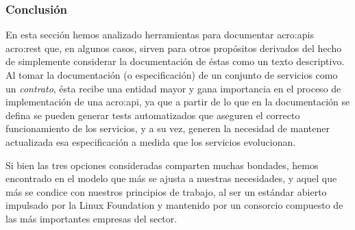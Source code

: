 \subsubsection{Conclusión}

En esta sección hemos analizado herramientas para documentar \glspl{acro:api} \gls{acro:rest} que, en algunos casos, sirven para otros propósitos derivados del hecho de simplemente considerar la documentación de éstas como un texto descriptivo. Al tomar la documentación (o especificación) de un conjunto de servicios como un \textit{contrato}, ésta recibe una entidad mayor y gana importancia en el proceso de implementación de una \gls{acro:api}, ya que a partir de lo que en la documentación se defina se pueden generar tests automatizados que aseguren el correcto funcionamiento de los servicios, y a su vez, generen la necesidad de mantener actualizada esa especificación a medida que los servicios evolucionan.

Si bien las tres opciones consideradas comparten muchas bondades, hemos encontrado en  el modelo que más se ajusta a nuestras necesidades, y aquel que más se condice con nuestros principios de trabajo, al ser un estándar abierto impulsado por la Linux Foundation y mantenido por un consorcio compuesto de las más importantes empresas del sector.
